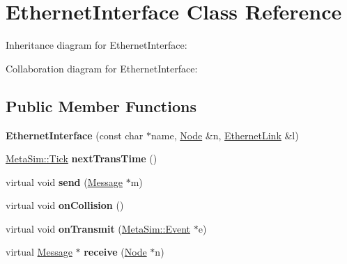 \hypertarget{classEthernetInterface}{}\section{Ethernet\+Interface Class Reference}
\label{classEthernetInterface}


Inheritance diagram for Ethernet\+Interface\+:


Collaboration diagram for Ethernet\+Interface\+:
\subsection*{Public Member Functions}
\begin{DoxyCompactItemize}
\item 
{\bfseries Ethernet\+Interface} (const char $\ast$name, \hyperlink{classNode}{Node} \&n, \hyperlink{classEthernetLink}{Ethernet\+Link} \&l)\hypertarget{classEthernetInterface_a098e33eda9e1451a9bbcea4968bdc311}{}\label{classEthernetInterface_a098e33eda9e1451a9bbcea4968bdc311}

\item 
\hyperlink{classMetaSim_1_1Tick}{Meta\+Sim\+::\+Tick} {\bfseries next\+Trans\+Time} ()\hypertarget{classEthernetInterface_a937e710ea4d64d229a93f6c1b9050be9}{}\label{classEthernetInterface_a937e710ea4d64d229a93f6c1b9050be9}

\item 
virtual void {\bfseries send} (\hyperlink{classMessage}{Message} $\ast$m)\hypertarget{classEthernetInterface_ae08eb19026a777d110ccceaea872b73b}{}\label{classEthernetInterface_ae08eb19026a777d110ccceaea872b73b}

\item 
virtual void {\bfseries on\+Collision} ()\hypertarget{classEthernetInterface_a38b2a444a24230bc804ef3bb53598ca8}{}\label{classEthernetInterface_a38b2a444a24230bc804ef3bb53598ca8}

\item 
virtual void {\bfseries on\+Transmit} (\hyperlink{classMetaSim_1_1Event}{Meta\+Sim\+::\+Event} $\ast$e)\hypertarget{classEthernetInterface_a8f2a1f1ad2ab77df6b7c887a2b5b68df}{}\label{classEthernetInterface_a8f2a1f1ad2ab77df6b7c887a2b5b68df}

\item 
virtual \hyperlink{classMessage}{Message} $\ast$ {\bfseries receive} (\hyperlink{classNode}{Node} $\ast$n)\hypertarget{classEthernetInterface_acb94ffe5ee4765fa1da3c07414d380da}{}\label{classEthernetInterface_acb94ffe5ee4765fa1da3c07414d380da}


\end{DoxyCompactItemize}
